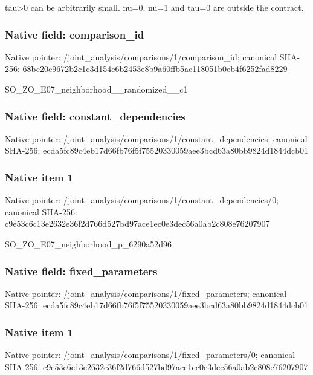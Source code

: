 \documentclass[10pt,a4paper]{article}
\begin{document}
\begingroup\raggedright\sloppy tau>0 can be arbitrarily small. nu=\allowbreak{}0,\allowbreak{} nu=\allowbreak{}1 and tau=\allowbreak{}0 are outside the contract.\par\endgroup

\subsubsection{Native field: comparison\_\allowbreak{}id}
Native pointer: /joint\_\allowbreak{}analysis/comparisons/1/comparison\_\allowbreak{}id; canonical SHA-256: 68bc20c9672b2c1c3d154e6b2453e8b9a60ffb5ac118051b0eb4f6252fad8229

\begingroup\raggedright\sloppy SO\_\allowbreak{}ZO\_\allowbreak{}E07\_\allowbreak{}neighborhood\_\allowbreak{}\_\allowbreak{}randomized\_\allowbreak{}\_\allowbreak{}c1\par\endgroup

\subsubsection{Native field: constant\_\allowbreak{}dependencies}
Native pointer: /joint\_\allowbreak{}analysis/comparisons/1/constant\_\allowbreak{}dependencies; canonical SHA-256: ecda5fc89c4eb17d66fb76f5f75520330059aee3bcd63a80bb9824d1844dcb01

\subsubsection{Native item 1}
Native pointer: /joint\_\allowbreak{}analysis/comparisons/1/constant\_\allowbreak{}dependencies/0; canonical SHA-256: c9e53c6c13e2632e36f2d766d527bd97ace1ec0e3dec56a0ab2c808e76207907

\begingroup\raggedright\sloppy SO\_\allowbreak{}ZO\_\allowbreak{}E07\_\allowbreak{}neighborhood\_\allowbreak{}p\_\allowbreak{}6290a52d96\par\endgroup

\subsubsection{Native field: fixed\_\allowbreak{}parameters}
Native pointer: /joint\_\allowbreak{}analysis/comparisons/1/fixed\_\allowbreak{}parameters; canonical SHA-256: ecda5fc89c4eb17d66fb76f5f75520330059aee3bcd63a80bb9824d1844dcb01

\subsubsection{Native item 1}
Native pointer: /joint\_\allowbreak{}analysis/comparisons/1/fixed\_\allowbreak{}parameters/0; canonical SHA-256: c9e53c6c13e2632e36f2d766d527bd97ace1ec0e3dec56a0ab2c808e76207907
\end{document}
